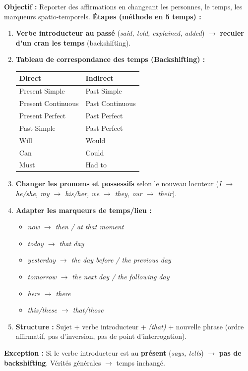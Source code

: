 \documentclass[11pt]{article}
\begin{document}
\begin{methode}
\textbf{Objectif :} Reporter des affirmations en changeant les personnes, le temps, les marqueurs spatio-temporels.
\medskip
\textbf{Étapes (méthode en 5 temps) :}
\begin{enumerate}
    \item \textbf{Verbe introducteur au passé} (\emph{said, told, explained, added}) $\rightarrow$ \textbf{reculer d'un cran les temps} (backshifting).
    \item \textbf{Tableau de correspondance des temps (Backshifting) :}
    \begin{center}
    \begin{tabular}{|l|l|}\hline
    \textbf{Direct} & \textbf{Indirect} \\ \hline
    Present Simple & Past Simple \\
    Present Continuous & Past Continuous \\
    Present Perfect & Past Perfect \\
    Past Simple & Past Perfect \\
    Will & Would \\
    Can & Could \\
    Must & Had to \\ \hline
    \end{tabular}
    \end{center}
    \item \textbf{Changer les pronoms et possessifs} selon le nouveau locuteur (\emph{I $\rightarrow$ he/she, my $\rightarrow$ his/her, we $\rightarrow$ they, our $\rightarrow$ their}).
    \item \textbf{Adapter les marqueurs de temps/lieu :}
    \begin{itemize}
        \item \emph{now $\rightarrow$ then / at that moment}
        \item \emph{today $\rightarrow$ that day}
        \item \emph{yesterday $\rightarrow$ the day before / the previous day}
        \item \emph{tomorrow $\rightarrow$ the next day / the following day}
        \item \emph{here $\rightarrow$ there}
        \item \emph{this/these $\rightarrow$ that/those}
    \end{itemize}
    \item \textbf{Structure :} Sujet + verbe introducteur + \emph{(that)} + nouvelle phrase (ordre affirmatif, pas d'inversion, pas de point d'interrogation).
\end{enumerate}
\textbf{Exception :} Si le verbe introducteur est au \textbf{présent} (\emph{says, tells}) $\rightarrow$ \textbf{pas de backshifting}. Vérités générales $\rightarrow$ temps inchangé.
\end{methode}
\end{document}
